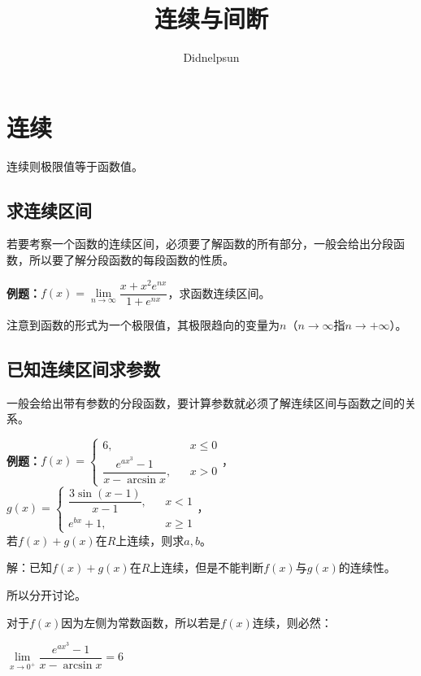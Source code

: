 \documentclass[UTF8, 12pt]{ctexart}
\author{Didnelpsun}
\title{连续与间断}
\date{}
\begin{document}
\maketitle
\pagestyle{empty}
\thispagestyle{empty}
\tableofcontents
\thispagestyle{empty}
\newpage
\pagestyle{plain}
\setcounter{page}{1}
\section{连续}

连续则极限值等于函数值。

\subsection{求连续区间}

若要考察一个函数的连续区间，必须要了解函数的所有部分，一般会给出分段函数，所以要了解分段函数的每段函数的性质。\medskip

\textbf{例题：}$f(x)=\lim\limits_{n\to\infty}\dfrac{x+x^2e^{nx}}{1+e^{nx}}$，求函数连续区间。\medskip

注意到函数的形式为一个极限值，其极限趋向的变量为$n$（$n\to\infty$指$n\to+\infty$）。

\subsection{已知连续区间求参数}

一般会给出带有参数的分段函数，要计算参数就必须了解连续区间与函数之间的关系。

\textbf{例题：}$f(x)=\left\{\begin{array}{lcl}
    6, & & x\leqslant 0 \\
    \dfrac{e^{ax^3}-1}{x-\arcsin x}, & & x>0
\end{array}
\right.$，$g(x)=\left\{\begin{array}{lcl}
    \dfrac{3\sin(x-1)}{x-1}, & & x<1 \\
    e^{bx}+1, & & x\geqslant 1
\end{array}
\right.$，\smallskip \\ 若$f(x)+g(x)$在$R$上连续，则求$a,b$。

解：已知$f(x)+g(x)$在$R$上连续，但是不能判断$f(x)$与$g(x)$的连续性。

所以分开讨论。

对于$f(x)$因为左侧为常数函数，所以若是$f(x)$连续，则必然：\medskip

$\lim\limits_{x\to 0^+}\dfrac{e^{ax^3}-1}{x-\arcsin x}=6$\medskip
\end{document}
